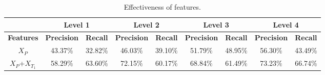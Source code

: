 \begin{table}[h]
  \small
  \centering
  \caption{Effectiveness of features.}
  \label{tab:features}
  \begin{tabular}{|c|c|c|c|c|c|c|c|c|}
  \hline
                                   & \multicolumn{2}{c|}{\textbf{Level 1}}                     & \multicolumn{2}{c|}{\textbf{Level 2}} & \multicolumn{2}{c|}{\textbf{Level 3}}                     & \multicolumn{2}{c|}{\textbf{Level 4}}                     \\ \hline
  \textbf{Features}                  & \textbf{Precision} & \multicolumn{1}{l|}{\textbf{Recall}} & \textbf{Precision}  & \textbf{Recall} & \textbf{Precision} & \multicolumn{1}{l|}{\textbf{Recall}} & \textbf{Precision} & \multicolumn{1}{l|}{\textbf{Recall}} \\ \hline
  $X_{P}$                            & 43.37$\%$               & 32.82$\%$                                 & 46.03$\%$                & 39.10$\%$            & 51.79$\%$               & 48.95$\%$                                 & 56.30$\%$               & 43.49$\%$                                 \\ \hline

%
%
%


$X_{P}$+$X_{T_1}$                   & 58.29$\%$               & 63.60$\%$                                 & 72.15$\%$                & 60.17$\%$            & 68.84$\%$               & 61.49$\%$                                 & 73.23$\%$               & 66.74$\%$\\ \hline


\end{tabular}
\end{table}
